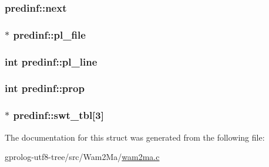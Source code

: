 \subsubsection[{\texorpdfstring{next}{next}}]{ predinf\+::next}\hypertarget{structpredinf_a5640b4a5b40d6208119e14349a52d8db}{}\label{structpredinf_a5640b4a5b40d6208119e14349a52d8db}
\subsubsection[{\texorpdfstring{pl\+\_\+file}{pl_file}}]{$\ast$ predinf\+::pl\+\_\+file}\hypertarget{structpredinf_a85bb945f5415fd2177b55ce91562c36c}{}\label{structpredinf_a85bb945f5415fd2177b55ce91562c36c}
\subsubsection[{\texorpdfstring{pl\+\_\+line}{pl_line}}]{\setlength{\rightskip}{0pt plus 5cm}int predinf\+::pl\+\_\+line}\hypertarget{structpredinf_a0bb58f984add8b6a8e040181a8181cbd}{}\label{structpredinf_a0bb58f984add8b6a8e040181a8181cbd}
\subsubsection[{\texorpdfstring{prop}{prop}}]{\setlength{\rightskip}{0pt plus 5cm}int predinf\+::prop}\hypertarget{structpredinf_a39785936db83e7bcf5036b5365423c5e}{}\label{structpredinf_a39785936db83e7bcf5036b5365423c5e}
\subsubsection[{\texorpdfstring{swt\+\_\+tbl}{swt_tbl}}]{$\ast$ predinf\+::swt\+\_\+tbl\mbox{[}3\mbox{]}}\hypertarget{structpredinf_a9e448a6b5c08b225ac0a07043f3a37c9}{}\label{structpredinf_a9e448a6b5c08b225ac0a07043f3a37c9}


The documentation for this struct was generated from the following file\+:\begin{DoxyCompactItemize}
\item 
gprolog-\/utf8-\/tree/src/\+Wam2\+Ma/\hyperlink{wam2ma_8c}{wam2ma.\+c}\end{DoxyCompactItemize}
